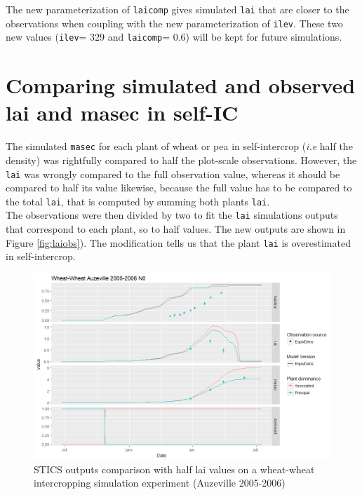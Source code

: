 \documentclass[
]{book}
\begin{document}
The new parameterization of \texttt{laicomp} gives simulated \texttt{lai} that are closer to the observations when coupling with the new parameterization of \texttt{ilev}. These two new values (\texttt{ilev}= 329 and \texttt{laicomp}= 0.6) will be kept for future simulations.

\hypertarget{comparing-simulated-and-observed-lai-and-masec-in-self-ic}{%
\section{Comparing simulated and observed lai and masec in self-IC}\label{comparing-simulated-and-observed-lai-and-masec-in-self-ic}}

The simulated \texttt{masec} for each plant of wheat or pea in self-intercrop (\emph{i.e} half the density) was rightfully compared to half the plot-scale observations. However, the \texttt{lai} was wrongly compared to the full observation value, whereas it should be compared to half its value likewise, because the full value has to be compared to the total \texttt{lai}, that is computed by summing both plants \texttt{lai}.\\
The observations were then divided by two to fit the \texttt{lai} simulations outputs that correspond to each plant, so to half values.
The new outputs are shown in Figure \ref{fig:laiobs}). The modification tells us that the plant \texttt{lai} is overestimated in self-intercrop.

\begin{figure}
\centering
\includegraphics{img/laiobs.png}
\caption{\label{fig:laicomp}STICS outputs comparison with half lai values on a wheat-wheat intercropping simulation experiment (Auzeville 2005-2006)}
\end{figure}
\end{document}
